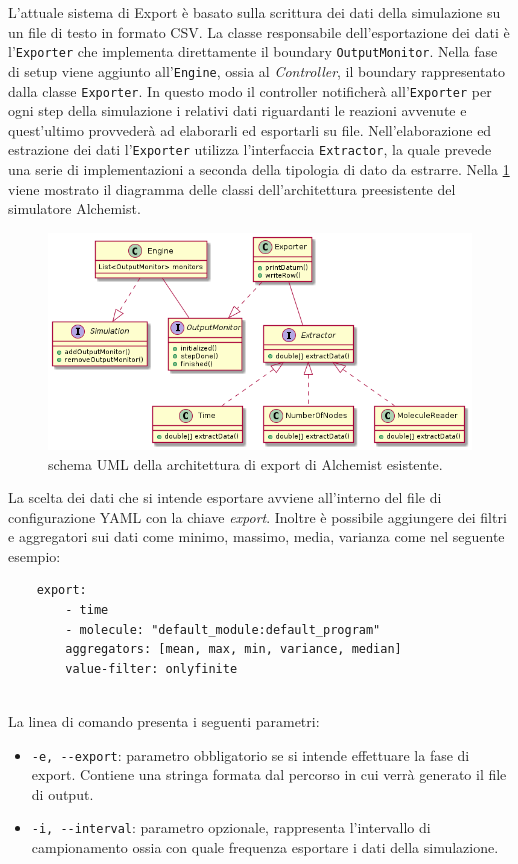 \documentclass[12pt,a4paper,openright,oneside]{book}
\begin{document}
L'attuale sistema di Export è basato sulla scrittura dei dati della simulazione su un file di testo in formato CSV.
La classe responsabile dell'esportazione dei dati è l'\texttt{Exporter} che implementa direttamente il boundary \texttt{OutputMonitor}.
Nella fase di setup viene aggiunto all'\texttt{Engine}, ossia al \textit{Controller}, il boundary rappresentato dalla classe \texttt{Exporter}. In questo modo il controller notificherà all'\texttt{Exporter} per ogni step della simulazione i relativi dati riguardanti le reazioni avvenute e quest'ultimo provvederà ad elaborarli ed esportarli su file.
Nell'elaborazione ed estrazione dei dati l'\texttt{Exporter} utilizza l'interfaccia \texttt{Extractor}, la quale prevede una serie di implementazioni a seconda della tipologia di dato da estrarre.
Nella \cref{fig:UML_old_arch} viene mostrato il diagramma delle classi dell'architettura preesistente del simulatore Alchemist.
\begin{figure}[H]
    \includegraphics[width=\textwidth]{images/alchemist-export-old.png}
    \caption{schema UML della architettura di export di Alchemist esistente.}
    \label{fig:UML_old_arch}
\end{figure}
La scelta dei dati che si intende esportare avviene all'interno del file di configurazione YAML con la chiave \textit{export}. Inoltre è possibile aggiungere dei filtri e aggregatori sui dati come minimo, massimo, media, varianza come nel seguente esempio:
\begin{verbatim}
    export:
        - time
        - molecule: "default_module:default_program"
        aggregators: [mean, max, min, variance, median]
        value-filter: onlyfinite
        
\end{verbatim}
La linea di comando presenta i seguenti parametri:
\begin{itemize}
    \item \texttt{-e, -{}-export}: parametro obbligatorio se si intende effettuare la fase di export. Contiene una stringa formata dal percorso in cui verrà generato il file di output.
    \item \texttt{-i, -{}-interval}: parametro opzionale, rappresenta l'intervallo di campionamento ossia con quale frequenza esportare i dati della simulazione.
\end{itemize}
\end{document}
